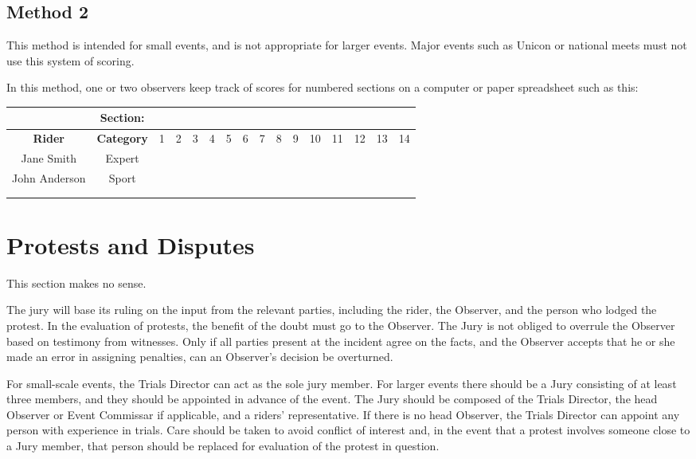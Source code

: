 \subsection{Method 2} 
This method is intended for small events, and is not appropriate for larger events. 
Major events such as Unicon or national meets must not use this system of scoring.

In this method, one or two observers keep track of scores for numbered sections on a computer or paper spreadsheet such as this:

\begin{tabular}{|c|c|c|c|c|c|c|c|c|c|c|c|c|c|c|c|}
\hline 
 & \textbf{Section:} & & &  & &  &  &  &  &  & & & &  &   \\ 
\hline 
\textbf{Rider} & \textbf{Category} & 1 & 2 & 3 & 4 & 5 & 6 & 7 & 8 & 9 & 10 & 11 & 12 & 13 & 14 \\ 
\hline 
Jane Smith & Expert &  &  &  &  &  &  &  &  &  &  &  &  &  & \\ 
\hline 
John Anderson & Sport &  &  &  &  &  &  &  & &  &  &  &  &  &  \\ 
\hline 
 &  &  &  &  &  &  &  &  &  &  &  &  &  &  & \\ 
\hline 
 &  &  &  &  &  &  &  &  &  &  &  &  &  &  & \\ 
\hline 
\end{tabular} 

\section{Protests and Disputes}

\begin{framed}
This section makes no sense.
\end{framed}

The jury will base its ruling on the input from the relevant parties, including the rider, the Observer, and the person who lodged the protest.
In the evaluation of protests, the benefit of the doubt must go to the Observer. 
The Jury is not obliged to overrule the Observer based on testimony from witnesses. 
Only if all parties present at the incident agree on the facts, and the Observer accepts that he or she made an error in assigning penalties, can an Observer's decision be overturned.

For small-scale events, the Trials Director can act as the sole jury member. 
For larger events there should be a Jury consisting of at least three members, and they should be appointed in advance of the event. 
The Jury should be composed of the Trials Director, the head Observer or Event Commissar if applicable, and a riders' representative. 
If there is no head Observer, the Trials Director can appoint any person with experience in trials. 
Care should be taken to avoid conflict of interest and, in the event that a protest involves someone close to a Jury member, that person should be replaced for evaluation of the protest in question.

